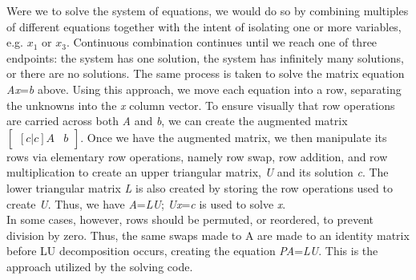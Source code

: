 \documentclass{article}
\begin{document}
Were we to solve the system of equations, we would do so by combining multiples of different equations together with the intent of isolating one or more variables, e.g. \begin{math}x_1 \text{ or } x_3\end{math}. Continuous combination continues until we reach one of three endpoints: the system has one solution, the system has infinitely many solutions, or there are no solutions. The same process is taken to solve the matrix  equation \emph{Ax}=\emph{b} above. Using this approach, we move each equation into a row, separating the unknowns into the \emph{x} column vector. To ensure visually that row operations are carried across both \emph{A} and \emph{b}, we can create the augmented matrix \begin{math}\begin{bmatrix}[c|c]A&b\end{bmatrix}\end{math}. Once we have the augmented matrix, we then manipulate its rows via elementary row operations, namely row swap, row addition, and row multiplication to create an upper triangular matrix, \emph{U} and its solution \emph{c}. The lower triangular matrix \emph{L} is also created by storing the row operations used to create \emph{U}. Thus, we have \emph{A}=\emph{LU}; \emph{Ux}=\emph{c} is used to solve \emph{x}.\\
In some cases, however, rows should be permuted, or reordered, to prevent division by zero. Thus, the same swaps made to A are made to an identity matrix before LU decomposition occurs, creating the equation \emph{PA}=\emph{LU}. This is the approach utilized by the solving code.
\end{document}
